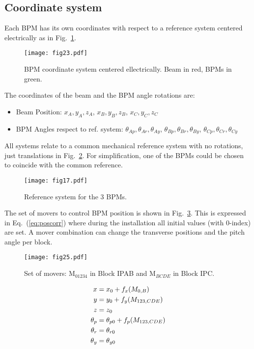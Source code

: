 \subsection{Coordinate system}\par
Each BPM has its own coordinates with respect to a reference system centered electrically as in Fig.~\ref{f:BPMcoordinate}.\par
\begin{figure}[ht]
\centering
  \texttt{[image: fig23.pdf]}\caption{BPM coordinate system centered ellectrically. Beam in red, BPMs in green.}\label{f:BPMcoordinate}
\end{figure}
The coordinates of the beam and the BPM angle rotations are:
\begin{itemize}
 \item Beam Position: $x_A,y_A,z_A$, $x_B,y_B,z_B$, $x_C,y_C,z_C$
 \item BPM Angles respect to ref. system:  $\theta_{Ap},\theta_{Ar},\theta_{Ay}$, $\theta_{Bp},\theta_{Br},\theta_{By}$, $\theta_{Cp},\theta_{Cr},\theta_{Cy}$
\end{itemize}
All systems relate to a common mechanical reference system with no rotations, just translations in Fig.~\ref{f:ref3BPMs}. For simplification, one of the BPMs could be chosen to coincide with the common reference.\par
\begin{figure}[h]
\centering
\texttt{[image: fig17.pdf]}\caption{Reference system for the 3 BPMs.}\label{f:ref3BPMs}
\end{figure}
The set of movers to control BPM position is shown in Fig.~\ref{f:moverss}. This is expressed in Eq.~(\ref{eq:poscorr}) where during the installation all initial values (with 0-index) are set. A mover combination can change the transverse positions and the pitch angle per block.\par
\begin{figure}[ht]
\centering
\texttt{[image: fig25.pdf]}\caption{Set of movers: M$_{01234}$ in Block IPAB and M$_{BCDE}$ in Block IPC.}\label{f:moverss}
\end{figure}
\begin{align}
 x &= x_0+f_x(M_{0,B})\label{eq:poscorr}\\
 y &= y_0+f_y(M_{123,CDE})\notag\\
 z &= z_0\notag\\
 \theta_p &= \theta_{p0}+f_p(M_{123,CDE})\notag\\
 \theta_r &= \theta_{r0}\notag\\
 \theta_y &= \theta_{y0}\notag
\end{align}\par

